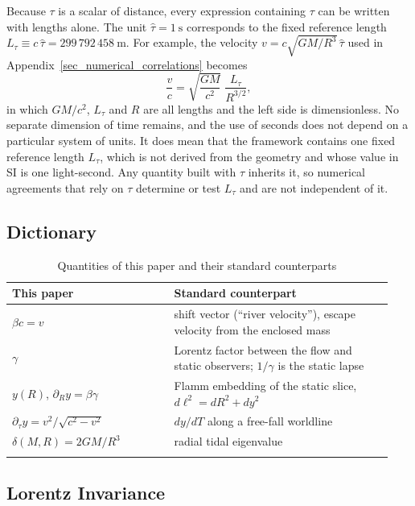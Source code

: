 \documentclass[pdflatex,sn-mathphys-num]{sn-jnl}%
\theoremstyle{thmstyleone}%
\theoremstyle{thmstyletwo}%
\theoremstyle{thmstylethree}%
\begin{document}
Because $\tau$ is a scalar of distance, every expression containing $\tau$ can be written with lengths alone. The unit $\hat{\tau}=1~\text{s}$ corresponds to the fixed reference length $L_\tau \equiv c\,\hat{\tau} = 299\,792\,458~\text{m}$. For example, the velocity $v=c\sqrt{GM/R^{3}}\,\hat{\tau}$ used in Appendix~\ref{sec_numerical_correlations} becomes
\begin{equation}\label{eq_length_only}
    \frac{v}{c}=\sqrt{\frac{GM}{c^{2}}}\;\frac{L_\tau}{R^{3/2}},
\end{equation}
in which $GM/c^{2}$, $L_\tau$ and $R$ are all lengths and the left side is dimensionless. No separate dimension of time remains, and the use of seconds does not depend on a particular system of units. It does mean that the framework contains one fixed reference length $L_\tau$, which is not derived from the geometry and whose value in SI is one light-second. Any quantity built with $\tau$ inherits it, so numerical agreements that rely on $\tau$ determine or test $L_\tau$ and are not independent of it.

\subsection{Dictionary}

\begin{table}[h]
\caption{Quantities of this paper and their standard counterparts}%
\label{table_dictionary}
\begin{tabular}{@{}p{0.40\linewidth}p{0.54\linewidth}@{}}
\toprule
This paper & Standard counterpart\\
\midrule
$\beta c=v$ & shift vector (``river velocity''), escape velocity from the enclosed mass\\
$\gamma$ & Lorentz factor between the flow and static observers; $1/\gamma$ is the static lapse\\
$y(R)$, $\partial_R y=\beta\gamma$ & Flamm embedding of the static slice, $d\ell^2=dR^2+dy^2$\\
$\partial_\tau y=v^2/\sqrt{c^2-v^2}$ & $dy/dT$ along a free-fall worldline\\
$\delta(M,R)=2GM/R^3$ & radial tidal eigenvalue\\
\botrule
\end{tabular}
\end{table}

\subsection{Lorentz Invariance}
\end{document}

